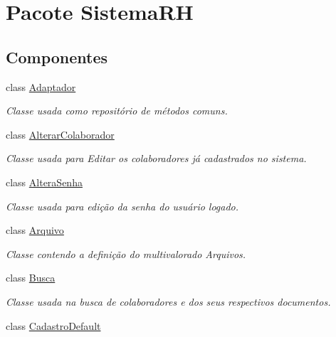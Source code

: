 \hypertarget{namespace_sistema_r_h}{
\section{Pacote SistemaRH}
\label{namespace_sistema_r_h}
}
\subsection*{Componentes}
\begin{DoxyCompactItemize}
\item 
class \hyperlink{class_sistema_r_h_1_1_adaptador}{Adaptador}
\begin{DoxyCompactList}\small\item\em Classe usada como repositório de métodos comuns. \item\end{DoxyCompactList}\item 
class \hyperlink{class_sistema_r_h_1_1_alterar_colaborador}{AlterarColaborador}
\begin{DoxyCompactList}\small\item\em Classe usada para Editar os colaboradores já cadastrados no sistema. \item\end{DoxyCompactList}\item 
class \hyperlink{class_sistema_r_h_1_1_altera_senha}{AlteraSenha}
\begin{DoxyCompactList}\small\item\em Classe usada para edição da senha do usuário logado. \item\end{DoxyCompactList}\item 
class \hyperlink{class_sistema_r_h_1_1_arquivo}{Arquivo}
\begin{DoxyCompactList}\small\item\em Classe contendo a definição do multivalorado Arquivos. \item\end{DoxyCompactList}\item 
class \hyperlink{class_sistema_r_h_1_1_busca}{Busca}
\begin{DoxyCompactList}\small\item\em Classe usada na busca de colaboradores e dos seus respectivos documentos. \item\end{DoxyCompactList}\item 
class \hyperlink{class_sistema_r_h_1_1_cadastro_default}{CadastroDefault}

\end{DoxyCompactItemize}
